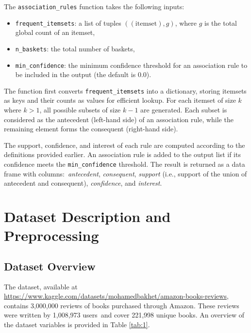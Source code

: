 \documentclass{Class/julia}
\begin{document}
The \texttt{association\_rules} function takes the following inputs:

\begin{itemize}
    \item \texttt{frequent\_itemsets}: a list of tuples \(((\text{itemset}), g)\), where \( g \) is the total global count of an itemset,
    \item \texttt{n\_baskets}: the total number of baskets,
    \item \texttt{min\_confidence}: the minimum confidence threshold for an association rule to be included in the output (the default is 0.0).
\end{itemize}

The function first converts \texttt{frequent\_itemsets} into a dictionary, storing itemsets as keys and their counts as values for efficient lookup. For each itemset of size \( k \) where \( k > 1 \), all possible subsets of size \( k-1 \) are generated. Each subset is considered as the antecedent (left-hand side) of an association rule, while the remaining element forms the consequent (right-hand side). 

The support, confidence, and interest of each rule are computed according to the definitions provided earlier. An association rule is added to the output list if its confidence meets the \texttt{min\_confidence} threshold. The result is returned as a data frame with columns:\ \textit{antecedent}, \textit{consequent}, \textit{support} (i.e., support of the union of antecedent and consequent), \textit{confidence}, and \textit{interest}.

\section{Dataset Description and Preprocessing}\label{sec:3}

\subsection{Dataset Overview}

The dataset, available at \url{https://www.kaggle.com/datasets/mohamedbakhet/amazon-books-reviews}, contains 3,000,000 reviews of books purchased through Amazon. These reviews were written by 1,008,973 users~and cover 221,998 unique books. An overview of the dataset variables is provided in Table \ref{tab:1}.
\end{document}
